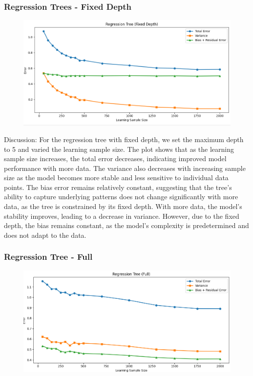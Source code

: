 \documentclass[a4paper,10pt]{article}
\begin{document}
\subsubsection{Regression Trees - Fixed Depth}

\begin{figure}[H]
    \centering
    \includegraphics[width=1\linewidth]{zacacaa.png}
\end{figure}

Discussion:  
For the regression tree with fixed depth, we set the maximum depth to 5 and varied the learning sample size. The plot shows that as the learning sample size increases, the total error decreases, indicating improved model performance with more data. The variance also decreases with increasing sample size as the model becomes more stable and less sensitive to individual data points. The bias error remains relatively constant, suggesting that the tree's ability to capture underlying patterns does not change significantly with more data, as the tree is constrained by its fixed depth. With more data, the model's stability improves, leading to a decrease in variance. However, due to the fixed depth, the bias remains constant, as the model's complexity is predetermined and does not adapt to the data.

\subsubsection{Regression Tree - Full}

\begin{figure}[H]
    \centering
    \includegraphics[width=1\linewidth]{zaczaw.png}
\end{figure}
\end{document}
